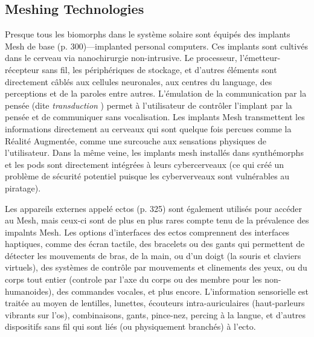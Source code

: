 \subsection{Meshing Technologies} 

Presque tous les biomorphs dans le système solaire sont équipés des implants Mesh de base (p. 300)—implanted personal computers. Ces implants sont cultivés dans le cerveau via nanochirurgie non-intrusive. Le processeur, l'émetteur-récepteur sans fil, les périphériques de stockage, et d'autres éléments sont directement câblés aux cellules neuronales, aux centres du language, des perceptions et de la paroles entre autres. L'émulation de la communication par la pensée (dite \textit{ transduction } ) permet à l'utilisateur de contrôler l'implant par la pensée et de communiquer sans vocalisation. Les implants Mesh transmettent les informations directement au cerveaux qui sont quelque fois percues comme la Réalité Augmentée, comme une surcouche aux sensations physiques de l'utilisateur. Dans la même veine, les implants mesh installés dans synthémorphs et les pods sont directement intégrées à leurs cybercerveaux (ce qui créé un problème de sécurité potentiel puisque les cyberverveaux sont vulnérables au piratage). 

Les appareils externes appelé ectos (p. 325) sont également utilisés pour accéder au Mesh, mais ceux-ci sont de plus en plus rares compte tenu de la prévalence des impalnts Mesh. Les options d'interfaces des ectos comprennent des interfaces haptiques, comme des écran tactile, des bracelets ou des gants qui permettent de détecter les mouvements de bras, de la main, ou d'un doigt (la souris et claviers virtuels), des systèmes de contrôle par mouvements et clinements des yeux, ou du corps tout entier (controle par l'axe du corps ou des membre pour les non-humanoides), des commandes vocales, et plus encore. L'information sensorielle est traitée au moyen de lentilles, lunettes, écouteurs intra-auriculaires (haut-parleurs vibrants sur l'os), combinaisons, gants, pince-nez, percing à la langue, et d'autres dispositifs sans fil qui sont liés (ou physiquement branchés) à l'ecto. 

